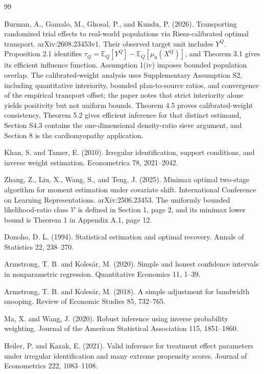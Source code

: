 \documentclass{article}
\begin{document}
\begin{thebibliography}{99}

   Burman, A., Gamalo, M., Ghosal, P., and Kundu, P. (2026). Transporting randomized trial effects to real-world populations via Riesz-calibrated optimal transport. arXiv:2608.23453v1. Their observed target unit includes \(Y^Q\). Proposition 2.1 identifies \(\tau_Q=\mathbb E_Q[Y^Q]-\mathbb E_Q[\mu_0(X^Q)]\), and Theorem 3.1 gives its efficient influence function. Assumption 1(iv) imposes bounded population overlap. The calibrated-weight analysis uses Supplementary Assumption S2, including quantitative interiority, bounded plan-to-source ratios, and convergence of the empirical transport offset; the paper notes that strict interiority alone yields positivity but not uniform bounds. Theorem 4.5 proves calibrated-weight consistency, Theorem 5.2 gives efficient inference for that distinct estimand, Section S4.3 contains the one-dimensional density-ratio sieve argument, and Section 8 is the cardiomyopathy application.

   Khan, S. and Tamer, E. (2010). Irregular identification, support conditions, and inverse weight estimation. Econometrica 78, 2021--2042.

   Zhang, Z., Liu, X., Wang, S., and Teng, J. (2025). Minimax optimal two-stage algorithm for moment estimation under covariate shift. International Conference on Learning Representations. arXiv:2506.23453. The uniformly bounded likelihood-ratio class \(\mathcal V\) is defined in Section 1, page 2, and its minimax lower bound is Theorem 1 in Appendix A.1, page 12.

   Donoho, D. L. (1994). Statistical estimation and optimal recovery. Annals of Statistics 22, 238--270.

   Armstrong, T. B. and Kolesár, M. (2020). Simple and honest confidence intervals in nonparametric regression. Quantitative Economics 11, 1--39.

   Armstrong, T. B. and Kolesár, M. (2018). A simple adjustment for bandwidth snooping. Review of Economic Studies 85, 732--765.

   Ma, X. and Wang, J. (2020). Robust inference using inverse probability weighting. Journal of the American Statistical Association 115, 1851--1860.

   Heiler, P. and Kazak, E. (2021). Valid inference for treatment effect parameters under irregular identification and many extreme propensity scores. Journal of Econometrics 222, 1083--1108.


\end{thebibliography}
\end{document}

